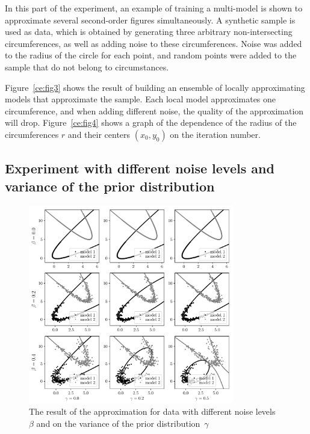 In this part of the experiment, an example of training a multi-model is shown to approximate several second-order figures simultaneously. A synthetic sample is used as data, which is obtained by generating three arbitrary non-intersecting circumferences, as well as adding noise to these circumferences. Noise was added to the radius of the circle for each point, and random points were added to the sample that do not belong to circumstances.

Figure~\ref{ce:fig3} shows the result of building an ensemble of locally approximating models that approximate the sample. Each local model approximates one circumference, and when adding different noise, the quality of the approximation will drop.
Figure~\ref{ce:fig4} shows a graph of the dependence of the radius of the circumferences $r$ and their centers $(x_0, y_0)$ on the iteration number. 

\subsection{ Experiment with different noise levels and variance of the prior distribution }
\begin{figure}[h!t]
\includegraphics[width=0.8\textwidth]{beta_gamma}
\caption{ The result of the approximation for data with different noise levels~$\beta$ and on the variance of the prior distribution~$\gamma$}
\label{ce:fig6}
\end{figure}

